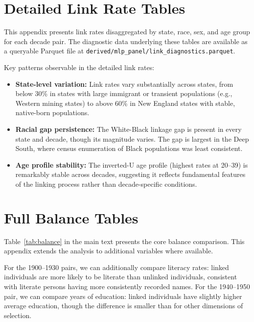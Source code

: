 \documentclass[12pt]{article}
\begin{document}
\section{Detailed Link Rate Tables}\label{app:linkrates}

This appendix presents link rates disaggregated by state, race, sex, and age group for each decade pair. The diagnostic data underlying these tables are available as a queryable Parquet file at \texttt{derived/mlp\_panel/link\_diagnostics.parquet}.

Key patterns observable in the detailed link rates:

\begin{itemize}
\item \textbf{State-level variation:} Link rates vary substantially across states, from below 30\% in states with large immigrant or transient populations (e.g., Western mining states) to above 60\% in New England states with stable, native-born populations.

\item \textbf{Racial gap persistence:} The White-Black linkage gap is present in every state and decade, though its magnitude varies. The gap is largest in the Deep South, where census enumeration of Black populations was least consistent.

\item \textbf{Age profile stability:} The inverted-U age profile (highest rates at 20--39) is remarkably stable across decades, suggesting it reflects fundamental features of the linking process rather than decade-specific conditions.
\end{itemize}


\section{Full Balance Tables}\label{app:balance}

Table~\ref{tab:balance} in the main text presents the core balance comparison. This appendix extends the analysis to additional variables where available.

For the 1900--1930 pairs, we can additionally compare literacy rates: linked individuals are more likely to be literate than unlinked individuals, consistent with literate persons having more consistently recorded names. For the 1940--1950 pair, we can compare years of education: linked individuals have slightly higher average education, though the difference is smaller than for other dimensions of selection.
\end{document}
